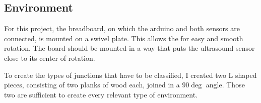 \subsection{Environment}
\label{subsec:environment}

For this project, the breadboard, on which the arduino and both sensors are connected, is mounted on a swivel plate.
This allows the for easy and smooth rotation.
The board should be mounted in a way that puts the ultrasound sensor close to its center of rotation.

To create the types of junctions that have to be classified, I created two L shaped pieces, consisting of two planks of wood each, joined in a $90\deg$ angle.
Those two are sufficient to create every relevant type of environment.